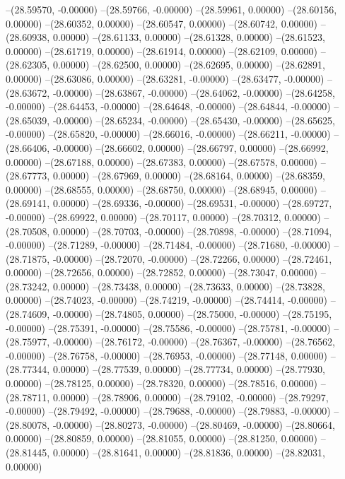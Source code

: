 --(28.59570, -0.00000)
--(28.59766, -0.00000)
--(28.59961, 0.00000)
--(28.60156, 0.00000)
--(28.60352, 0.00000)
--(28.60547, 0.00000)
--(28.60742, 0.00000)
--(28.60938, 0.00000)
--(28.61133, 0.00000)
--(28.61328, 0.00000)
--(28.61523, 0.00000)
--(28.61719, 0.00000)
--(28.61914, 0.00000)
--(28.62109, 0.00000)
--(28.62305, 0.00000)
--(28.62500, 0.00000)
--(28.62695, 0.00000)
--(28.62891, 0.00000)
--(28.63086, 0.00000)
--(28.63281, -0.00000)
--(28.63477, -0.00000)
--(28.63672, -0.00000)
--(28.63867, -0.00000)
--(28.64062, -0.00000)
--(28.64258, -0.00000)
--(28.64453, -0.00000)
--(28.64648, -0.00000)
--(28.64844, -0.00000)
--(28.65039, -0.00000)
--(28.65234, -0.00000)
--(28.65430, -0.00000)
--(28.65625, -0.00000)
--(28.65820, -0.00000)
--(28.66016, -0.00000)
--(28.66211, -0.00000)
--(28.66406, -0.00000)
--(28.66602, 0.00000)
--(28.66797, 0.00000)
--(28.66992, 0.00000)
--(28.67188, 0.00000)
--(28.67383, 0.00000)
--(28.67578, 0.00000)
--(28.67773, 0.00000)
--(28.67969, 0.00000)
--(28.68164, 0.00000)
--(28.68359, 0.00000)
--(28.68555, 0.00000)
--(28.68750, 0.00000)
--(28.68945, 0.00000)
--(28.69141, 0.00000)
--(28.69336, -0.00000)
--(28.69531, -0.00000)
--(28.69727, -0.00000)
--(28.69922, 0.00000)
--(28.70117, 0.00000)
--(28.70312, 0.00000)
--(28.70508, 0.00000)
--(28.70703, -0.00000)
--(28.70898, -0.00000)
--(28.71094, -0.00000)
--(28.71289, -0.00000)
--(28.71484, -0.00000)
--(28.71680, -0.00000)
--(28.71875, -0.00000)
--(28.72070, -0.00000)
--(28.72266, 0.00000)
--(28.72461, 0.00000)
--(28.72656, 0.00000)
--(28.72852, 0.00000)
--(28.73047, 0.00000)
--(28.73242, 0.00000)
--(28.73438, 0.00000)
--(28.73633, 0.00000)
--(28.73828, 0.00000)
--(28.74023, -0.00000)
--(28.74219, -0.00000)
--(28.74414, -0.00000)
--(28.74609, -0.00000)
--(28.74805, 0.00000)
--(28.75000, -0.00000)
--(28.75195, -0.00000)
--(28.75391, -0.00000)
--(28.75586, -0.00000)
--(28.75781, -0.00000)
--(28.75977, -0.00000)
--(28.76172, -0.00000)
--(28.76367, -0.00000)
--(28.76562, -0.00000)
--(28.76758, -0.00000)
--(28.76953, -0.00000)
--(28.77148, 0.00000)
--(28.77344, 0.00000)
--(28.77539, 0.00000)
--(28.77734, 0.00000)
--(28.77930, 0.00000)
--(28.78125, 0.00000)
--(28.78320, 0.00000)
--(28.78516, 0.00000)
--(28.78711, 0.00000)
--(28.78906, 0.00000)
--(28.79102, -0.00000)
--(28.79297, -0.00000)
--(28.79492, -0.00000)
--(28.79688, -0.00000)
--(28.79883, -0.00000)
--(28.80078, -0.00000)
--(28.80273, -0.00000)
--(28.80469, -0.00000)
--(28.80664, 0.00000)
--(28.80859, 0.00000)
--(28.81055, 0.00000)
--(28.81250, 0.00000)
--(28.81445, 0.00000)
--(28.81641, 0.00000)
--(28.81836, 0.00000)
--(28.82031, 0.00000)
